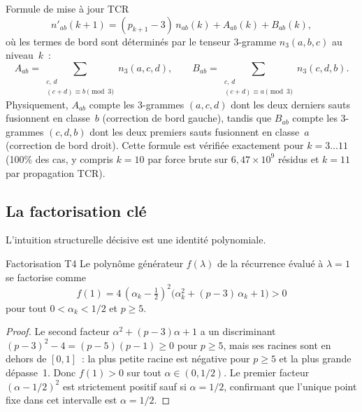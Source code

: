 \documentclass[12pt,a4paper]{article}
\begin{document}
\begin{thmbox}{Formule de mise à jour TCR}
\label{thm:crt_update}
\begin{equation}
  n'_{ab}(k+1) = (p_{k+1} - 3)\,n_{ab}(k) + A_{ab}(k) + B_{ab}(k),
  \label{eq:crt_update}
\end{equation}
où les termes de bord sont déterminés par le tenseur 3-gramme
$n_3(a,b,c)$ au niveau~$k$~:
\begin{equation}
  A_{ab} = \!\!\sum_{\substack{c,\,d \\ (c+d) \equiv b \pmod{3}}}
  \!\! n_3(a,c,d), \qquad
  B_{ab} = \!\!\sum_{\substack{c,\,d \\ (c+d) \equiv a \pmod{3}}}
  \!\! n_3(c,d,b).
  \label{eq:crt_AB}
\end{equation}
Physiquement, $A_{ab}$ compte les 3-grammes $(a,c,d)$ dont les deux
derniers sauts fusionnent en classe~$b$ (correction de bord gauche),
tandis que $B_{ab}$ compte les 3-grammes $(c,d,b)$ dont les deux
premiers sauts fusionnent en classe~$a$ (correction de bord droit).
Cette formule est vérifiée exactement pour $k = 3\ldots 11$ (100\%
des cas, y compris $k = 10$ par force brute sur
$6{,}47 \times 10^9$ résidus et $k = 11$ par propagation TCR).
\end{thmbox}

\subsection{La factorisation clé}
\label{sec:ch7_factorization}

L'intuition structurelle décisive est une identité polynomiale.

\begin{thmbox}{Factorisation T4}
\label{thm:factorization}
Le polynôme générateur $f(\lambda)$ de la récurrence évalué à
$\lambda = 1$ se factorise comme
\begin{equation}
  f(1) = 4\,(\alpha_k - \tfrac{1}{2})^2
  \bigl(\alpha_k^2 + (p-3)\,\alpha_k + 1\bigr) > 0
  \label{eq:factorization}
\end{equation}
pour tout $0 < \alpha_k < 1/2$ et $p \geq 5$.

\begin{proof}
Le second facteur $\alpha^2 + (p-3)\alpha + 1$ a un discriminant
$(p-3)^2 - 4 = (p-5)(p-1) \geq 0$ pour $p \geq 5$, mais ses racines
sont en dehors de $[0,1]$~: la plus petite racine est négative pour
$p \geq 5$ et la plus grande dépasse~1. Donc $f(1) > 0$ sur tout
$\alpha \in (0, 1/2)$. Le premier facteur $({\alpha - 1/2})^2$ est
strictement positif sauf si $\alpha = 1/2$, confirmant que l'unique
point fixe dans cet intervalle est $\alpha = 1/2$.
\end{proof}
\end{thmbox}
\end{document}
